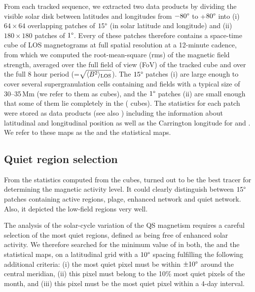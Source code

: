 \documentclass{aa}
\begin{document}
From each tracked sequence, we extracted two data products by dividing the visible solar disk  between latitudes and longitudes from $-80\degree$ to +$80\degree$ into (i) $64\times 64$  overlapping patches of $15\degree$ (in solar latitude and longitude)  and (ii) $180\times 180$ patches of $1\degree$.
Every of these patches therefore contains a space-time cube of LOS magnetograms at full spatial resolution at a 12-minute cadence,
from which we 
computed the 
root-mean-square
(rms) 
of the magnetic field strength, averaged over the full field of view (FoV) of the tracked cube 
and over the full 8 hour period
(\brms{}=$\sqrt{\langle B^2\rangle_{\rm LOS}}$).
The $15\degree$ patches (i) are large enough to cover several supergranulation cells containing \NW{} and \IN{} fields \cite[]{2010LRSP....7....2R} with a typical size of 30--35\,Mm (we refer to them as \nw{} cubes), and the $1\degree$ patches (ii) are small enough that some of them lie completely in the \IN{} (\inw{} cubes). 
The statistics for each patch were stored as data products (see also ) including the information about 
latitudinal and longitudinal position as well as the Carrington 
longitude for \NW{} and \IN{}. We refer to these maps as the \nw{} and the \inw{} statistical maps.

\subsection{Quiet region selection\label{quietregion}}

From the 
statistics computed from the cubes, 
\brms{}
turned out to be the best tracer for determining the magnetic activity level. It could clearly distinguish between $15\degree$ patches containing active regions, plage, enhanced network and quiet network. Also, it
depicted
the low-field \IN{} regions very well.

The analysis of the solar-cycle variation of the 
QS
magnetism requires a careful selection of the most quiet regions, defined as being free of enhanced solar activity. We therefore searched for the minimum value of \brms{} in both, the \nw{} and the \inw{} statistical maps, on a latitudinal grid with a $10\degree$ spacing fulfilling the following additional criteria:
(i) the most quiet pixel must be within $\pm10\degree$ around the central meridian,
(ii) this pixel must belong to the 10\% most quiet pixels of the month, and
(iii) this pixel must be the most quiet pixel within a 4-day interval.
\end{document}
